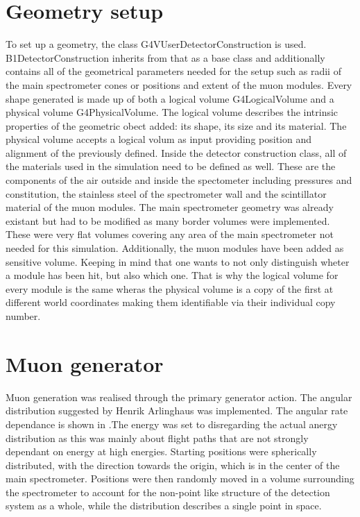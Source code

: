  \section{Geometry setup}
  \label{ch:Simulation software:sec:Geometry setup}
  To set up a geometry, the class G4VUserDetectorConstruction is used. B1DetectorConstruction inherits from that as a base class and additionally contains all of the geometrical parameters needed for the setup such as radii of the main spectrometer cones or positions and extent of the muon modules. Every shape generated is made up of both a logical volume G4LogicalVolume and a physical volume G4PhysicalVolume. The logical volume describes the intrinsic properties of the geometric obect added: its shape, its size and its material. The physical volume accepts a logical volum as input providing position and alignment of the previously defined.
  Inside the detector construction class, all of the materials used in the simulation need to be defined as well. These are the components of the air outside and inside the spectometer including pressures and constitution, the stainless steel of the spectrometer wall and the scintillator material of the muon modules.
  The main spectrometer geometry was already  existant but had to be modified as many border volumes were implemented. These were very flat volumes covering any area of the main spectrometer not needed for this simulation. Additionally, the muon modules have been added as sensitive volume. Keeping in mind that one wants to not only distinguish wheter a module has been hit, but also which one. That is why the logical volume for every module is the same wheras the physical volume is a copy of the first at different world coordinates making them identifiable via their individual copy number.
  
  \section{Muon generator}
  \label{ch:Simulation software:sec:Muon generator}
  
  Muon generation was realised through the primary generator action. The angular distribution suggested by Henrik Arlinghaus  was implemented. The angular rate dependance is shown in .The energy was set to  disregarding the actual anergy distribution as this was mainly about flight paths that are not strongly dependant on energy at high energies. Starting positions were spherically distributed, with the direction towards the origin, which is in the center of the main spectrometer. Positions were then randomly moved in a volume surrounding the spectrometer to account for the non-point like structure of the detection system as a whole, while the distribution describes a single point in space.
  
